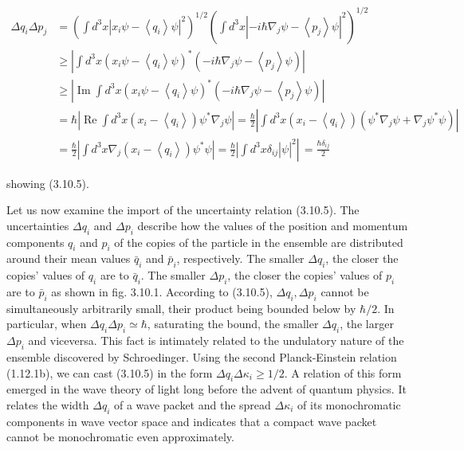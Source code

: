 \documentclass{article}
\begin{document}
\begin{align*}
\Delta q_{i} \Delta p_{j} & =\left(\int d^{3} x\left|x_{i} \psi-\left\langle q_{i}\right\rangle \psi\right|^{2}\right)^{1 / 2}\left(\int d^{3} x\left|-i \hbar \nabla_{j} \psi-\left\langle p_{j}\right\rangle \psi\right|^{2}\right)^{1 / 2}  \tag{3.10.8}\\
& \geq\left|\int d^{3} x\left(x_{i} \psi-\left\langle q_{i}\right\rangle \psi\right)^{*}\left(-i \hbar \nabla_{j} \psi-\left\langle p_{j}\right\rangle \psi\right)\right| \\
& \geq\left|\operatorname{Im} \int d^{3} x\left(x_{i} \psi-\left\langle q_{i}\right\rangle \psi\right)^{*}\left(-i \hbar \nabla_{j} \psi-\left\langle p_{j}\right\rangle \psi\right)\right| \\
& =\hbar\left|\operatorname{Re} \int d^{3} x\left(x_{i}-\left\langle q_{i}\right\rangle\right) \psi^{*} \nabla_{j} \psi\right|=\frac{\hbar}{2}\left|\int d^{3} x\left(x_{i}-\left\langle q_{i}\right\rangle\right)\left(\psi^{*} \nabla_{j} \psi+\nabla_{j} \psi^{*} \psi\right)\right| \\
& \left.=\frac{\hbar}{2}\left|\int d^{3} x \nabla_{j}\left(x_{i}-\left\langle q_{i}\right\rangle\right) \psi^{*} \psi\right|=\left.\frac{\hbar}{2}\left|\int d^{3} x \delta_{i j}\right| \psi\right|^{2} \right\rvert\,=\frac{\hbar \delta_{i j}}{2}
\end{align*}
 
showing (3.10.5).

Let us now examine the import of the uncertainty relation (3.10.5). The
uncertainties $\Delta q_{i}$ and $\Delta p_{i}$ describe how the values of the position and momentum components $q_{i}$ and $p_{i}$ of the copies of the particle in the ensemble are distributed around their mean values $\bar{q}_{i}$ and $\bar{p}_{i}$, respectively. The smaller $\Delta q_{i}$, the closer the copies' values of $q_{i}$ are to $\bar{q}_{i}$. The smaller $\Delta p_{i}$, the closer the copies' values of $p_{i}$ are to $\bar{p}_{i}$ as shown in fig. 3.10.1. According to (3.10.5), $\Delta q_{i}, \Delta p_{i}$ cannot be simultaneously arbitrarily small, their product being bounded below by $\hbar / 2$. In particular, when $\Delta q_{i} \Delta p_{i} \simeq \hbar$, saturating the bound, the smaller $\Delta q_{i}$, the larger $\Delta p_{i}$ and viceversa. This fact is intimately related to the undulatory nature of the ensemble discovered by Schroedinger. Using the second Planck-Einstein relation (1.12.1b), we can cast (3.10.5) in the form $\Delta q_{i} \Delta \kappa_{i} \geq 1 / 2$. A relation of this form emerged in the wave theory of light long before the advent of quantum physics. It relates the width $\Delta q_{i}$ of a wave packet and the spread $\Delta \kappa_{i}$ of its monochromatic components in wave vector space and indicates that a compact wave packet cannot be monochromatic even approximately.
\end{document}
